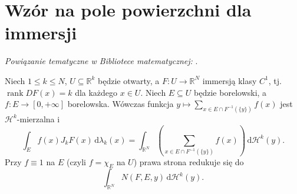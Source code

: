 \section{Wzór na pole powierzchni dla immersji}

\noindent\emph{Powiązanie tematyczne w Bibliotece matematycznej:} .

\begin{twierdzenie}
\label{thm:immersion-area-28}
Niech $1\le k\le N$, $U\subseteq\mathbb R^k$
będzie otwarty, a $F:U\to\mathbb R^N$
immersją klasy $C^1$, tj.
$\operatorname{rank}DF(x)=k$ dla każdego $x\in U$.
Niech $E\subseteq U$ będzie borelowski,
a $f:E\to[0,+\infty]$ borelowska.
Wówczas funkcja
$y\mapsto\sum_{x\in E\cap F^{-1}(\{y\})}f(x)$
jest $\mathcal H^k$-mierzalna i
\begin{equation}\label{eq:area-immersion-28}
 \int_E f(x)J_kF(x)\,\mathrm d\lambda_k(x)
 =\int_{\mathbb R^N}\left(
 \sum_{x\in E\cap F^{-1}(\{y\})}f(x)\right)
 \,\mathrm d\mathcal H^k(y).
\end{equation}
Przy $f\equiv1$ na $E$ (czyli $f=\chi_E$ na $U$)
prawa strona redukuje się do
\[
 \int_{\mathbb R^N} N(F,E,y)\,\mathrm d\mathcal H^k(y).
\]
\end{twierdzenie}
